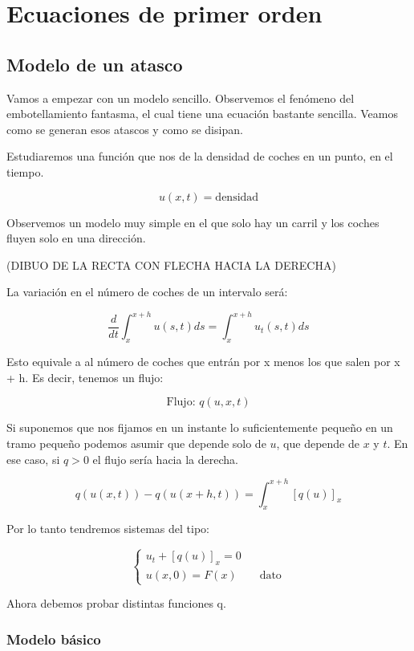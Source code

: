 \chapter{Ecuaciones de primer orden}

\section{Modelo de un atasco}

	Vamos a empezar con un modelo sencillo. Observemos el fenómeno del embotellamiento fantasma, el cual tiene una ecuación bastante sencilla. Veamos como se generan esos atascos y como se disipan.

	Estudiaremos una función que nos de la densidad de coches en un punto, en el tiempo.

	$$u(x,t) = \text{densidad}$$

	Observemos un modelo muy simple en el que solo hay un carril y los coches fluyen solo en una dirección.

	(DIBUO DE LA RECTA CON FLECHA HACIA LA DERECHA)

	La variación en el número de coches de un intervalo será:

	$$ \frac{d}{dt} \int^{x+h}_{x} u(s,t) ds = \int^{x+h}_{x} u_t(s,t) ds $$

	Esto equivale a al número de coches que entrán por x menos los que salen por x + h. Es decir, tenemos un flujo:

	$$\text{Flujo: } q(u, x, t)$$

	Si suponemos que nos fijamos en un instante lo suficientemente pequeño en un tramo pequeño podemos asumir que depende solo de $u$, que depende de $x$ y $t$. En ese caso, si $q > 0$ el flujo sería hacia la derecha.

	$$ q(u(x,t)) - q(u(x+h,t)) = \int^{x+h}_{x} [q(u)]_{x} $$

	Por lo tanto tendremos sistemas del tipo:

	\begin{equation*}
	\left\{
	\begin{array}{l}
	u_t + [q(u)]_{x} = 0 \\
	u(x, 0) = F(x) \quad \quad \text{dato}
	\end{array}
	\right.
	\end{equation*}

	Ahora debemos probar distintas funciones q.


	\subsection{Modelo básico}

